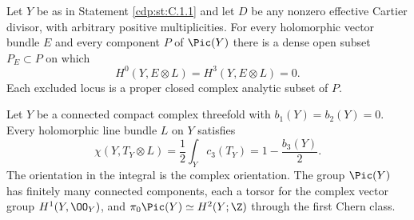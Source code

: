 
\begin{proposition}\label{cdp:st:C.1.2}
Let $Y$ be as in Statement \ref{cdp:st:C.1.1} and let $D$ be any nonzero effective
Cartier divisor, with arbitrary positive multiplicities. For every
holomorphic vector bundle $E$ and every component $P$ of $\Pic(Y)$ there
is a dense open subset $P_E\subset P$ on which
\[
 H^0(Y,E\otimes L)=H^3(Y,E\otimes L)=0.
\]
Each excluded locus is a proper closed complex analytic subset of $P$.
\end{proposition}

\begin{proposition}\label{cdp:st:C.1.1}
Let $Y$ be a connected compact complex threefold with
$b_1(Y)=b_2(Y)=0$. Every holomorphic line bundle $L$ on $Y$ satisfies
\[
 \chi(Y,T_Y\otimes L)=\frac12\int_Yc_3(T_Y)
 =1-\frac{b_3(Y)}2.
\]
The orientation in the integral is the complex orientation. The group
$\Pic(Y)$ has finitely many connected components, each a torsor for the
complex vector group $H^1(Y,\OO_Y)$, and
$\pi_0\Pic(Y)\simeq H^2(Y;\Z)$ through the first Chern class.
\end{proposition}

